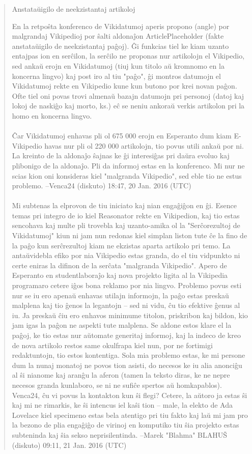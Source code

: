 \begin{quote}
 Anstataŭigilo de neekzistantaj artikoloj

En la retpoŝta konferenco de Vikidatumoj aperis propono (angle) por malgrandaj Vikipedioj por ŝalti aldonaĵon ArticlePlaceholder (fakte anstataŭigilo de neekzistantaj paĝoj). Ĝi funkcias tiel ke kiam uzanto entajpas ion en serĉilon, la serĉilo ne proponas nur artikolojn el Vikipedio, sed ankaŭ erojn en Vikidatumoj (tiuj kun titolo aŭ kromnomo en la koncerna lingvo) kaj post iro al tiu "paĝo", ĝi montros datumojn el Vikidatumoj rekte en Vikipedio kune kun butono por krei novan paĝon. Ofte tiel oni povas trovi almenaŭ bazajn datumojn pri personoj (datoj kaj lokoj de naskiĝo kaj morto, ks.) eĉ se neniu ankoraŭ verkis artikolon pri la homo en koncerna lingvo. \\
\\
Ĉar Vikidatumoj enhavas pli ol 675 000 erojn en Esperanto dum kiam E-Vikipedio havas nur pli ol 220 000 artikolojn, tio povus utili ankaŭ por ni. La kreinto de la aldonaĵo ŝajnas ke ĝi interesiĝas pri daŭra evoluo kaj plibonigo de la aldonaĵo. Pli da informoj estas en la konferenco. Mi nur ne scias kion oni konsideras kiel "malgranda Vikipedio", sed eble tio ne estus problemo. --Venca24 (diskuto) 18:47, 20 Jan. 2016 (UTC) \\
\\
    Mi subtenas la elprovon de tiu iniciato kaj nian engaĝiĝon en ĝi. Esence temas pri integro de io kiel Reasonator rekte en Vikipedion, kaj tio estas sencohava kaj multe pli trovebla kaj uzanto-amika ol la "Serĉorezultoj de Vikidatumoj" kiun ni jam nun redonas kiel simplan liston tute ĉe la fino de la paĝo kun serĉrezultoj kiam ne ekzistas aparta artikolo pri temo. La antaŭvidebla efiko por nia Vikipedio estas granda, do el tiu vidpunkto ni certe eniras la difinon de la serĉata "malgranda Vikipedio". Apero de Esperanto en studentlaboraĵo kaj nova projekto ligita al la Vikipedia programaro cetere iĝos bona reklamo por nia lingvo. Problemo povus esti nur se iu ero apenaŭ enhavas utilajn informojn, la paĝo estas preskaŭ malplena kaj tio ĝenos la legantojn – sed ni vidu, ĉu tio efektive ĝenus al iu. Ja preskaŭ ĉiu ero enhavos minimume titolon, priskribon kaj bildon, kio jam igas la paĝon ne aspekti tute malplena. Se aldone estos klare el la paĝoj, ke tio estas nur aŭtomate generitaj informoj, kaj la indeco de kreo de nova artikolo restos same okulfrapa kiel nun, por ne fortimigi redaktuntojn, tio estos kontentiga. Sola mia problemo estas, ke mi persone dum la nunaj monatoj ne povos tion asisti, do necesos ke iu alia anonciĝu al ŝi nianome kaj aranĝu la aferon (tamen la teksto diras, ke ne nepre necesos granda kunlaboro, se ni ne sufiĉe spertos aŭ homkapablos). Venca24, ĉu vi povus la kontakton kun ŝi flegi? Cetere, la aŭtoro ja estas ŝi kaj mi ne rimarkis, ke ŝi intencus iel kaŝi tion – male, la elekto de Ada Lovelace kiel specimeno estas bela atentigo pri tiu fakto kaj laŭ mi jam pro la bezono de plia engaĝiĝo de virinoj en komputiko tiu ŝia projekto estas subteninda kaj ŝia sekso neprisilentinda. --Marek "Blahma" BLAHUŠ (diskuto) 09:11, 21 Jan. 2016 (UTC) \\

\end{quote}
